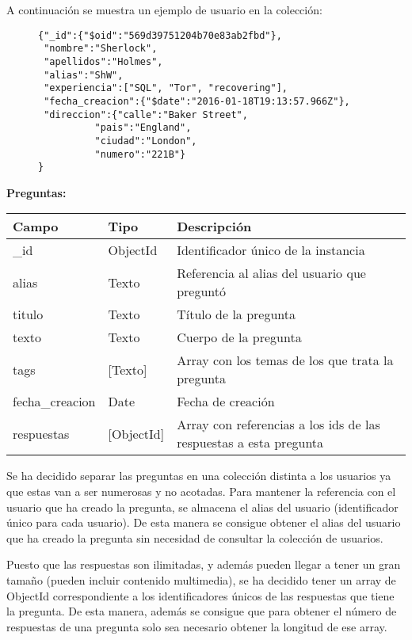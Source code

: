 \documentclass[11pt,a4paper]{article}
\begin{document}
A continuación se muestra un ejemplo de usuario en la colección: \\
\newpage{}
\begin{figure}[!h]
\begin{lstlisting}
{"_id":{"$oid":"569d39751204b70e83ab2fbd"},
 "nombre":"Sherlock",
 "apellidos":"Holmes",
 "alias":"ShW",
 "experiencia":["SQL", "Tor", "recovering"],
 "fecha_creacion":{"$date":"2016-01-18T19:13:57.966Z"},
 "direccion":{"calle":"Baker Street",
	      "pais":"England",
	      "ciudad":"London",
	      "numero":"221B"}
}
\end{lstlisting}
\end{figure}



\textbf{Preguntas:}\\


\begin{table}[h] \centering
  \begin{tabular}{@{}lll@{}} \toprule 
    Campo & Tipo & Descripción \\ \midrule 
    \_id     & ObjectId & Identificador único de la instancia \\
    alias    & Texto & Referencia al alias del usuario que preguntó \\
    titulo   & Texto & Título de la pregunta \\
    texto    & Texto & Cuerpo de la pregunta \\
    tags     & [Texto] & Array con los temas de los que trata la pregunta \\
    fecha\_creacion & Date & Fecha de creación \\
    respuestas & [ObjectId] & Array con referencias a los ids de las
                              respuestas a esta pregunta \\
    \bottomrule
\end{tabular}
\end{table}

Se ha decidido separar las preguntas en una colección distinta a los
usuarios ya que estas van a ser numerosas y no acotadas. Para mantener la
referencia con el usuario que ha creado la pregunta, se almacena el alias
del usuario (identificador único para cada usuario). De esta manera se
consigue obtener el alias del usuario que ha creado la pregunta sin
necesidad de consultar la colección de usuarios.

Puesto que las respuestas son ilimitadas, y además pueden llegar a tener un
gran tamaño (pueden incluir contenido multimedia), se ha decidido tener un
array de ObjectId correspondiente a los identificadores únicos de las
respuestas que tiene la pregunta. De esta manera, además se consigue que
para obtener el número de respuestas de una pregunta solo sea necesario
obtener la longitud de ese array.
\end{document}
